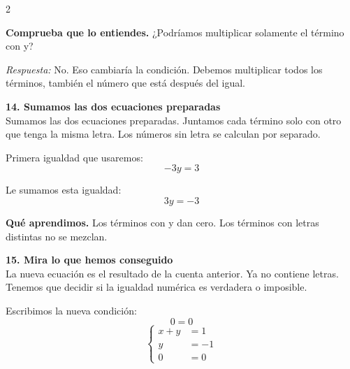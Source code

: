 \documentclass[11pt,a4paper,landscape]{article}
\begin{document}
\begin{multicols*}{2}
\begin{minipage}{\linewidth}
\par\smallskip\textbf{Comprueba que lo entiendes.} ¿Podríamos multiplicar solamente el término con y?\par\textit{Respuesta:} No. Eso cambiaría la condición. Debemos multiplicar todos los términos, también el número que está después del igual.
\end{minipage}\par\medskip
\noindent\begin{minipage}{\linewidth}\textbf{14. Sumamos las dos ecuaciones preparadas}\\[2pt]Sumamos las dos ecuaciones preparadas. Juntamos cada término solo con otro que tenga la misma letra. Los números sin letra se calculan por separado.
\par{}\par\smallskip
\par\smallskip Primera igualdad que usaremos:
\[-3y = 3\]
\par\smallskip Le sumamos esta igualdad:
\[3y = -3\]
\par\smallskip\textbf{Qué aprendimos.} Los términos con y dan cero. Los términos con letras distintas no se mezclan.
\end{minipage}\par\medskip
\noindent\begin{minipage}{\linewidth}\textbf{15. Mira lo que hemos conseguido}\\[2pt]La nueva ecuación es el resultado de la cuenta anterior. Ya no contiene letras. Tenemos que decidir si la igualdad numérica es verdadera o imposible.
\par\smallskip Escribimos la nueva condición:
\[0 = 0\]
\[\left\{\begin{aligned}x + y &= 1\\y &= -1\\0 &= 0\end{aligned}\right.\]

\end{minipage}
\end{multicols*}
\end{document}
